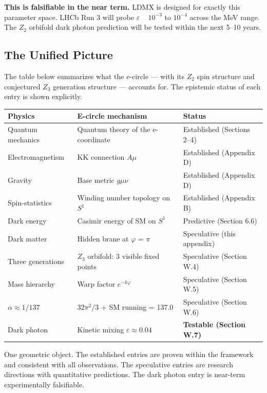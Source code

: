 \documentclass[aps,prd,preprint,superscriptaddress,longbibliography,floatfix]{revtex4-2}
\theoremstyle{remark}
\begin{document}
\textbf{This is falsifiable in the near term.} LDMX is designed for exactly this parameter space. LHCb Run 3 will probe $\varepsilon$ ~ $10^{-3}$ to $10^{-4}$ across the MeV range. The $Z_{2}$ orbifold dark photon prediction will be tested within the next 5--10 years.



\subsection{The Unified Picture}

The table below summarizes what the e-circle --- with its $Z_{2}$ spin structure and conjectured $Z_{3}$ generation structure --- accounts for. The epistemic status of each entry is shown explicitly.


\begin{table}[H]
\begin{ruledtabular}
\begin{tabular}{p{5.0cm}p{5.0cm}p{5.0cm}}
Physics & E-circle mechanism & Status \\
\hline
Quantum mechanics & Quantum theory of the e-coordinate & Established (Sections 2--4) \\
Electromagnetism & KK connection $A\mu$ & Established (Appendix D) \\
Gravity & Base metric $g\mu\nu$ & Established (Appendix D) \\
Spin-statistics & Winding number topology on $S^{1}$ & Established (Appendix B) \\
Dark energy & Casimir energy of SM on $S^{1}$ & Predictive (Section 6.6) \\
Dark matter & Hidden brane at $\varphi$ = $\pi$ & Speculative (this appendix) \\
Three generations & $Z_{3}$ orbifold: 3 visible fixed points & Speculative (Section W.4) \\
Mass hierarchy & Warp factor $e^{-k\varphi}$ & Speculative (Section W.5) \\
$\alpha \approx 1/137$ & $32\pi^{2}/3$ + SM running = 137.0 & Speculative (Section W.6) \\
Dark photon & Kinetic mixing $\varepsilon \approx 0.04$ & \textbf{Testable (Section W.7)} \\
\end{tabular}
\end{ruledtabular}
\end{table}

One geometric object. The established entries are proven within the framework and consistent with all observations. The speculative entries are research directions with quantitative predictions. The dark photon entry is near-term experimentally falsifiable.
\end{document}
